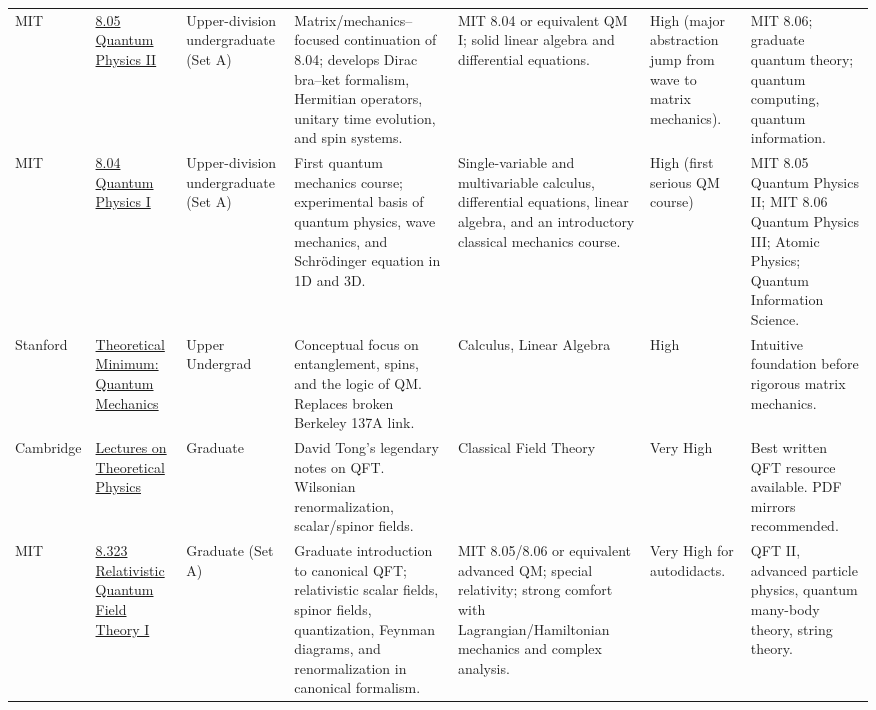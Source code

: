 \documentclass[10pt, a4paper, landscape]{article}
\begin{document}
\begin{longtable}{L{2cm} L{3.5cm} L{1.8cm} L{6cm} L{3.5cm} L{2cm} L{5cm}}
    \addlinespace
    MIT & \href{MIT OCW page for 8.05 Quantum Physics II (Fall 2013).}{8.05 Quantum Physics II} & Upper-division undergraduate (Set A) & Matrix/mechanics–focused continuation of 8.04; develops Dirac bra–ket formalism, Hermitian operators, unitary time evolution, and spin systems. & MIT 8.04 or equivalent QM I; solid linear algebra and differential equations. & High (major abstraction jump from wave to matrix mechanics). & MIT 8.06; graduate quantum theory; quantum computing, quantum information. \\
    \addlinespace
    MIT & \href{https://ocw.mit.edu/courses/8-04-quantum-physics-i-spring-2016/}{8.04 Quantum Physics I} & Upper-division undergraduate (Set A) & First quantum mechanics course; experimental basis of quantum physics, wave mechanics, and Schrödinger equation in 1D and 3D. & Single-variable and multivariable calculus, differential equations, linear algebra, and an introductory classical mechanics course. & High (first serious QM course) & MIT 8.05 Quantum Physics II; MIT 8.06 Quantum Physics III; Atomic Physics; Quantum Information Science. \\
    \addlinespace
    \addlinespace
    \addlinespace
    \addlinespace
    Stanford & \href{https://theoreticalminimum.com/courses/quantum-mechanics/2012/winter}{Theoretical Minimum: Quantum Mechanics} & Upper Undergrad & Conceptual focus on entanglement, spins, and the logic of QM. Replaces broken Berkeley 137A link. & Calculus, Linear Algebra & High & Intuitive foundation before rigorous matrix mechanics. \\
    \addlinespace
    Cambridge & \href{https://www.damtp.cam.ac.uk/user/tong/qft.html}{Lectures on Theoretical Physics} & Graduate & David Tong's legendary notes on QFT. Wilsonian renormalization, scalar/spinor fields. & Classical Field Theory & Very High & Best written QFT resource available. PDF mirrors recommended. \\
    \addlinespace
    MIT & \href{MIT OCW or MIT course site for 8.323 Relativistic Quantum Field Theory I.}{8.323 Relativistic Quantum Field Theory I} & Graduate (Set A) & Graduate introduction to canonical QFT; relativistic scalar fields, spinor fields, quantization, Feynman diagrams, and renormalization in canonical formalism. & MIT 8.05/8.06 or equivalent advanced QM; special relativity; strong comfort with Lagrangian/Hamiltonian mechanics and complex analysis. & Very High for autodidacts. & QFT II, advanced particle physics, quantum many-body theory, string theory. \\

\end{longtable}
\end{document}
